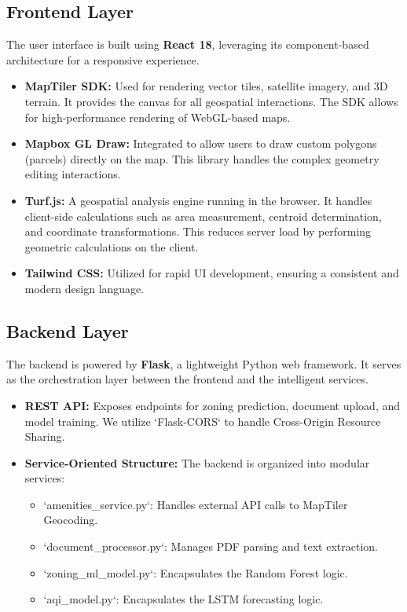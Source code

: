 \documentclass[12pt,a4paper]{report}
\begin{document}
\subsection{Frontend Layer}
The user interface is built using \textbf{React 18}, leveraging its component-based architecture for a responsive experience.
\begin{itemize}
    \item \textbf{MapTiler SDK:} Used for rendering vector tiles, satellite imagery, and 3D terrain. It provides the canvas for all geospatial interactions. The SDK allows for high-performance rendering of WebGL-based maps.
    \item \textbf{Mapbox GL Draw:} Integrated to allow users to draw custom polygons (parcels) directly on the map. This library handles the complex geometry editing interactions.
    \item \textbf{Turf.js:} A geospatial analysis engine running in the browser. It handles client-side calculations such as area measurement, centroid determination, and coordinate transformations. This reduces server load by performing geometric calculations on the client.
    \item \textbf{Tailwind CSS:} Utilized for rapid UI development, ensuring a consistent and modern design language.
\end{itemize}

\subsection{Backend Layer}
The backend is powered by \textbf{Flask}, a lightweight Python web framework. It serves as the orchestration layer between the frontend and the intelligent services.
\begin{itemize}
    \item \textbf{REST API:} Exposes endpoints for zoning prediction, document upload, and model training. We utilize `Flask-CORS` to handle Cross-Origin Resource Sharing.
    \item \textbf{Service-Oriented Structure:} The backend is organized into modular services:
    \begin{itemize}
        \item `amenities_service.py`: Handles external API calls to MapTiler Geocoding.
        \item `document_processor.py`: Manages PDF parsing and text extraction.
        \item `zoning_ml_model.py`: Encapsulates the Random Forest logic.
        \item `aqi_model.py`: Encapsulates the LSTM forecasting logic.
    \end{itemize}
\end{itemize}
\end{document}
